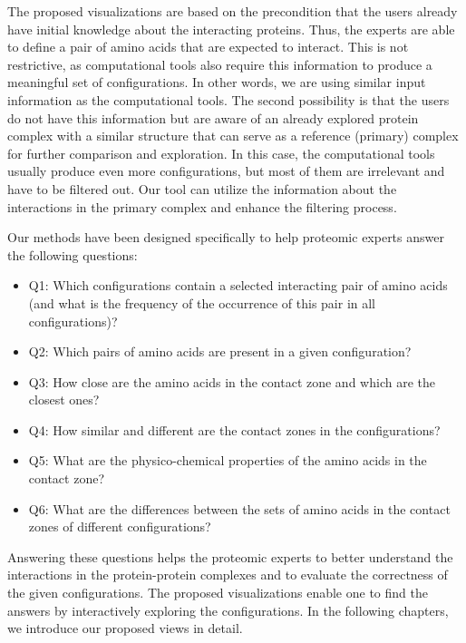 \documentclass{bmcart}
\begin{document}
The proposed visualizations are based on the precondition that the users already have initial knowledge about the interacting proteins.
Thus, the experts are able to define a pair of amino acids that are expected to interact.
This is not restrictive, as computational tools also require this information to produce a meaningful set of configurations. 
In other words, we are using similar input information as the computational tools.
The second possibility is that the users do not have this information but are aware of an already explored protein complex with a similar structure that can serve as a reference (primary) complex for further comparison and exploration. 
In this case, the computational tools usually produce even more configurations, but most of them are irrelevant and have to be filtered out. 
Our tool can utilize the information about the interactions in the primary complex and enhance the filtering process.

Our methods have been designed specifically to help proteomic experts answer the following questions:
\begin{itemize}
\item Q1: Which configurations contain a selected interacting pair of amino acids (and what is the frequency of the occurrence of this pair in all configurations)?
\item Q2: Which pairs of amino acids are present in a given configuration?
\item Q3: How close are the amino acids in the contact zone and which are the closest ones?
\item Q4: How similar and different are the contact zones in the configurations?
\item Q5: What are the physico-chemical properties of the amino acids in the contact zone?
\item Q6: What are the differences between the sets of amino acids in the contact zones of different configurations?
\end{itemize}

Answering these questions helps the proteomic experts to better understand the interactions in the protein-protein complexes and to evaluate the correctness of the given configurations.
The proposed visualizations enable one to find the answers by interactively exploring the configurations.
In the following chapters, we introduce our proposed views in detail.
\end{document}
